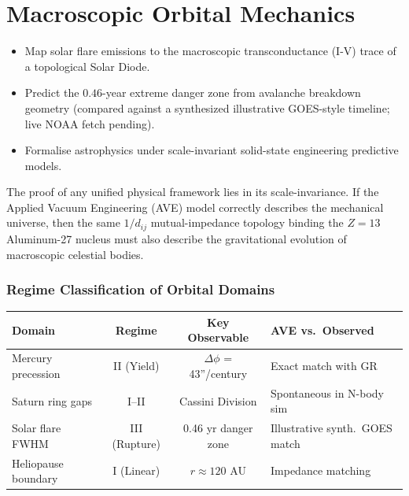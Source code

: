 \chapter{Macroscopic Orbital Mechanics}
\label{ch:orbital_mechanics}


\begin{objectivebox}
\begin{itemize}
    \item Map solar flare emissions to the macroscopic transconductance (I-V) trace of a topological Solar Diode.
    \item Predict the $0.46$-year extreme danger zone from avalanche breakdown geometry (compared against a synthesized illustrative GOES-style timeline; live NOAA fetch pending).
    \item Formalise astrophysics under scale-invariant solid-state engineering predictive models.
\end{itemize}
\end{objectivebox}

The proof of any unified physical framework lies in its scale-invariance. If the Applied Vacuum Engineering (AVE) model correctly describes the mechanical universe, then the same $1/d_{ij}$ mutual-impedance topology binding the $Z=13$ Aluminum-27 nucleus must also describe the gravitational evolution of macroscopic celestial bodies.

\subsection*{Regime Classification of Orbital Domains}
\begin{center}
\small
\renewcommand{\arraystretch}{1.2}
\begin{tabularx}{\textwidth}{@{}lccX@{}}
\toprule
\textbf{Domain} & \textbf{Regime} & \textbf{Key Observable} & \textbf{AVE vs.\ Observed} \\
\midrule
Mercury precession    & II (Yield)   & $\Delta\phi$ = 43''/century & Exact match with GR \\
Saturn ring gaps      & I--II        & Cassini Division   & Spontaneous in N-body sim \\
Solar flare FWHM      & III (Rupture) & 0.46 yr danger zone & Illustrative synth.\ GOES match \\
Heliopause boundary   & I (Linear)   & $r \approx 120$ AU  & Impedance matching \\
\bottomrule
\end{tabularx}
\end{center}


